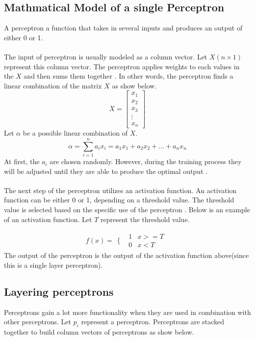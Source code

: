 
\subsection{Mathmatical Model of a single Perceptron}	
		
A perceptron  a function that takes in several inputs and produces an output of either 0 or 1.\\ \\
The input of perceptron is usually modeled as a column vector. Let $X(n\times1)$ represent this column vector. The perceptron applies weights to each values in the $X$ and then sums them together \cite{book}. In other words, the perceptron finds a linear combination of the matrix $X$ as show below.
$$
X = 
\begin{bmatrix}
	x_1 \\
	x_2 \\
	x_3 \\
	\vdots \\
	x_n
\end{bmatrix} 
$$
Let $\alpha$ be a possible linear combination of $X$. 
$$
	\alpha = \sum_{i=1}^{n} a_ix_i = a_1x_1 + a_2x_2 + \dots + a_nx_n
$$
At first, the $a_i$ are chosen randomly. However, during the training process they will be adjusted until they are able to produce the optimal output \cite{book}. \\ \\
The next step of the perceptron utilizes an activation function. An activation function can be either 0 or 1, depending on a threshold value. The threshold value is selected based on the specific use of the perceptron \cite{book}. Below is an example of an activation function. Let $T$ represent the threshold value.

$$f(x) = 
	\begin{array}{cc}
  	\{ & 
    \begin{array}{cc}
    	1 & x >= T \\
    	0 & x < T
    \end{array}
\end{array}
$$
The output of the perceptron is the output of the activation function above(since this is a single layer perceptron).

\subsection{Layering perceptrons}

Perceptrons gain a lot more functionality when they are used in combination with other perceptrons. Let $p_i$ represent a perceptron. Perceptrons are stacked together to build column vectors of perceptrons as show below.

